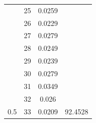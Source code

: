 \documentclass{article}
\begin{document}
\begin{multicols}{2}
\begin{table}[H]
\begin{tabular}{|c|c|c|c|}
 & 25 & 0.0259 &  \\ \cline{2-3}
 & 26 & 0.0229 &  \\ \cline{2-3}
 & 27 & 0.0279 &  \\ \cline{2-3}
 & 28 & 0.0249 &  \\ \cline{2-3}
 & 29 & 0.0239 &  \\ \cline{2-3}
 & 30 & 0.0279 &  \\ \cline{2-3}
 & 31 & 0.0349 &  \\ \cline{2-3}
 & 32 & 0.026 &  \\ \cline{2-3}
\multirow{-34}{*}{0.5} & 33 & 0.0209 & \multirow{-21}{*}{92.4528} \\ \hline
\end{tabular}
\end{table}



\end{multicols}
\end{document}
